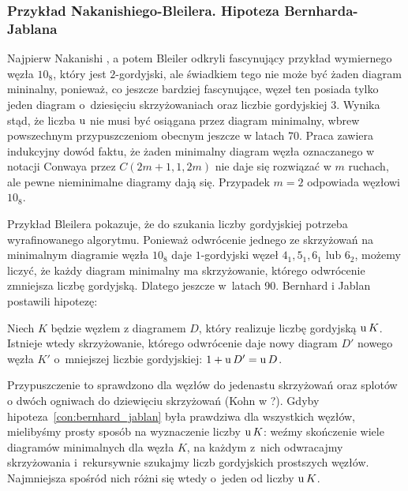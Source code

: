 
\subsubsection{Przykład Nakanishiego-Bleilera. Hipoteza Bernharda-Jablana}
Najpierw Nakanishi \cite{nakanishi83}, a potem Bleiler \cite{bleiler84} odkryli fascynujący przykład wymiernego węzła $10_8$, który jest $2$-gordyjski, ale świadkiem tego nie może być żaden diagram mininalny, ponieważ, co jeszcze bardziej fascynujące, węzeł ten posiada tylko jeden diagram o~dziesięciu skrzyżowaniach oraz liczbie gordyjskiej 3.
%
%
%
Wynika stąd, że liczba $\operatorname{u}$ nie musi być osiągana przez diagram minimalny, wbrew powszechnym przypuszczeniom obecnym jeszcze w latach 70.
Praca \cite{bernhard94} zawiera indukcyjny dowód faktu, że żaden minimalny diagram węzła oznaczanego w notacji Conwaya przez $C(2m+1, 1, 2m)$ nie daje się rozwiązać w $m$ ruchach, ale pewne nieminimalne diagramy dają się.
Przypadek $m = 2$ odpowiada węzłowi $10_8$.

Przykład Bleilera pokazuje, że do szukania liczby gordyjskiej potrzeba wyrafinowanego algorytmu.
Ponieważ odwrócenie jednego ze skrzyżowań na minimalnym diagramie węzła $10_8$ daje $1$-gordyjski węzeł $4_1, 5_1, 6_1$ lub $6_2$, możemy liczyć, że każdy diagram minimalny ma skrzyżowanie, którego odwrócenie zmniejsza liczbę gordyjską.
Dlatego jeszcze w~latach 90. Bernhard \cite{bernhard94} i Jablan \cite{jablan98} postawili hipotezę:

\begin{conjecture}
%
%
%
\label{con:bernhard_jablan}%
    Niech $K$ będzie węzłem z diagramem $D$, który realizuje liczbę gordyjską $\operatorname{u} K$.
    Istnieje wtedy skrzyżowanie, którego odwrócenie daje nowy diagram $D'$ nowego węzła $K'$ o~mniejszej liczbie gordyjskiej: $1 + \operatorname{u} D' = \operatorname{u} D$.
\end{conjecture}

Przypuszczenie to sprawdzono dla węzłów do jedenastu skrzyżowań oraz splotów o dwóch ogniwach do dziewięciu skrzyżowań (Kohn w \cite{kohn93}?).
%
Gdyby hipoteza~\ref{con:bernhard_jablan} była prawdziwa dla wszystkich węzłów, mielibyśmy prosty sposób na wyznaczenie liczby $\operatorname{u} K$: weźmy skończenie wiele diagramów minimalnych dla węzła $K$, na każdym z~nich odwracajmy skrzyżowania i~rekursywnie szukajmy liczb gordyjskich prostszych węzłów.
Najmniejsza spośród nich różni się wtedy o~jeden od liczby $\operatorname{u} K$.

